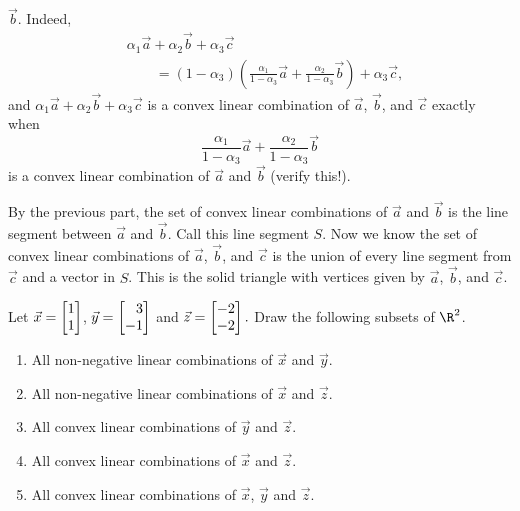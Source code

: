\begin{exercises}
\begin{problist}
\begin{solution}
\begin{enumerate}
				$\vec b$. Indeed,
				\[
				\begin{split}
					&\alpha_{1} \vec a+\alpha_{2} \vec b+ \alpha_{3}
					\vec c \\
					&\qquad= (1-\alpha_{3})\left(\tfrac{\alpha_1}{1-\alpha_3}\vec
					a + \tfrac{\alpha_2}{1-\alpha_3}\vec b\right)+\alpha_{3}
					\vec c,
				\end{split}
				\]
				 and $\alpha_{1} \vec a+\alpha_{2} \vec b+ \alpha_{3}
				\vec c$ is a convex linear combination of $\vec
				a$, $\vec b$, and $\vec c$ exactly when
				\[
					\frac{\alpha_1}{1-\alpha_3}\vec a + \frac{\alpha_2}{1-\alpha_3}\vec
					b
				\]
				 is a convex linear combination of $\vec a$ and $\vec
				b$ (verify this!).

				By the previous part, the set of convex linear combinations
				of $\vec a$ and $\vec b$ is the line segment
				between $\vec a$ and $\vec b$. Call this line segment $S$.
				Now we know the set of convex linear
				combinations of $\vec a$, $\vec b$, and $\vec c$
				is the union of every line segment from $\vec c$
				and a vector in $S$. This is the solid triangle with
				vertices given by $\vec a$, $\vec b$, and $\vec	c$.
		\end{enumerate}
	\end{solution}

	\prob
		Let $\vec x=\mat{1 \\ 1}$, $\vec y = \mat{3 \\ -1}$ and $\vec z=\mat{-2 \\ -2}.$  Draw the following subsets of $\R^2$.
		\begin{enumerate}
		\item All non-negative linear combinations of $\vec x$ and $\vec y$.
		\item All non-negative linear combinations of $\vec x$ and $\vec z$.
		\item\label{PROBcconvex} All convex linear combinations of $\vec y$ and $\vec z$.
		\item\label{PROBdconvex} All convex linear combinations of $\vec x$ and $\vec z$.
		\item All convex linear combinations of $\vec x$, $\vec y$ and $\vec z$.


\end{enumerate}
\end{problist}
\end{exercises}
